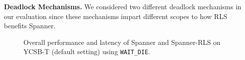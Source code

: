 \noindent\textbf{Deadlock Mechanisms.} We considered two different deadlock mechanisms in our evaluation since these mechanisms impart different scopes to how RLS benefits Spanner.

\begin{figure}[t]
	\centering
	\hfill
	\caption{Overall performance and latency of Spanner and Spanner-RLS  on YCSB-T (default setting) using \texttt{WAIT\_DIE}.}\label{fig:eval:spanner:overall:wait}
\end{figure}


